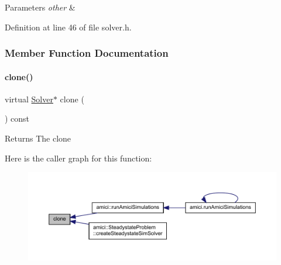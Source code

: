 \begin{DoxyParams}{Parameters}
{\em other} & \\
\hline
\end{DoxyParams}


Definition at line 46 of file solver.\+h.



\subsubsection{Member Function Documentation}
\mbox{\label{classamici_1_1_solver_ad40c0e06f5ee35afc1dd60e9f80ac5be}} 
\paragraph{\texorpdfstring{clone()}{clone()}}
{\footnotesize\ttfamily virtual \mbox{\hyperlink{classamici_1_1_solver}{Solver}}$\ast$ clone (\begin{DoxyParamCaption}{ }\end{DoxyParamCaption}) const\hspace{0.3cm}{\ttfamily [pure virtual]}}

\begin{DoxyReturn}{Returns}
The clone 
\end{DoxyReturn}
Here is the caller graph for this function\+:
\nopagebreak
\begin{figure}[H]
\begin{center}
\leavevmode
\includegraphics[width=350pt]{classamici_1_1_solver_ad40c0e06f5ee35afc1dd60e9f80ac5be_icgraph}
\end{center}
\end{figure}
\mbox{\label{classamici_1_1_solver_a5cffde567803181ec12c71117c74b47a}} 
